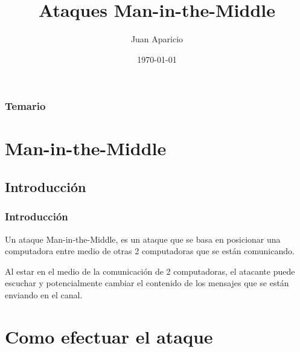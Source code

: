 \documentclass{beamer}
\title[Ataques Man in The Middle]{Ataques Man-in-the-Middle} %
\author{Juan Aparicio} %
\institute[UDE] %
{
	Universidad de la Empresa \\ %
}
\date{\today} %
\begin{document}
	
\begin{frame}
	\titlepage %
\end{frame}

\begin{frame}
\frametitle{Temario} %
\tableofcontents %
\end{frame}


\section{Man-in-the-Middle} %

\subsection{Introducción}
\begin{frame}
\frametitle{Introducción}
\par Un ataque Man-in-the-Middle, es un ataque que se basa en posicionar una computadora entre medio de otras 2 computadoras que se están comunicando. 
\par Al estar en el medio de la comunicación de 2 computadoras, el atacante puede escuchar y potencialmente cambiar el contenido de los mensajes que se están enviando en el canal.
\end{frame}

\section{Como efectuar el ataque}
\end{document}
